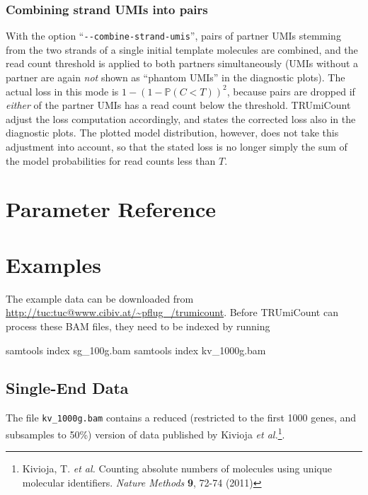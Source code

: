 \documentclass[10pt]{article}
\newenvironment{shellcode}%
   {\bgroup\topsep=0pt\partopsep=0pt\shaded\verbatim}%
   {\endverbatim\endshaded\egroup}
\newcommand{\ddarg}[1]{\texttt{-{}-#1}}
\begin{document}
\subsubsection*{Combining strand UMIs into pairs}

With the option ``\ddarg{combine-strand-umis}'', pairs of partner UMIs stemming from the two strands of a single initial template molecules are combined, and the read count threshold is applied to both partners simultaneously (UMIs without a partner are again \emph{not} shown as ``phantom UMIs'' in the diagnostic plots). The actual loss in this mode is $1 - (1-\mathbb{P}(C < T))^2$, because pairs are dropped if \emph{either} of the partner UMIs has a read count below the threshold. TRUmiCount adjust the loss computation accordingly, and states the corrected loss also in the diagnostic plots. The plotted model distribution, however, does not take this adjustment into account, so that the stated loss is no longer simply the sum of the model probabilities for read counts less than $T$.

\pagebreak
\section{Parameter Reference}\label{parameter-reference}

\begin{sloppypar}
\begin{description}

\end{description}
\end{sloppypar}

\pagebreak
\section{Examples}\label{examples}

The example data can be downloaded from \url{http://tuc:tuc@www.cibiv.at/~pflug_/trumicount}. Before TRUmiCount can process these BAM files, they need to be indexed by running

\begin{shellcode}
samtools index sg_100g.bam
samtools index kv_1000g.bam
\end{shellcode}

\subsection{Single-End Data}

The file \texttt{kv\_1000g.bam} contains a reduced (restricted to the first 1000 genes, and subsamples to 50\%) version of data published by Kivioja \textit{et al.}\footnote{Kivioja, T. \textit{et al.} Counting absolute numbers of molecules using unique molecular identifiers. \textit{Nature Methods} \textbf{9}, 72-74 (2011)}.
\end{document}
